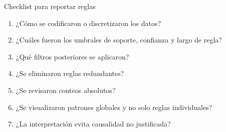 \documentclass[10pt,aspectratio=169]{beamer}
\begin{document}
%
%
%
%
%
%

\begin{frame}{Checklist para reportar reglas}
\begin{enumerate}
  \item ¿Cómo se codificaron o discretizaron los datos?
  \item ¿Cuáles fueron los umbrales de soporte, confianza y largo de regla?
  \item ¿Qué filtros posteriores se aplicaron?
  \item ¿Se eliminaron reglas redundantes?
  \item ¿Se revisaron conteos absolutos?
  \item ¿Se visualizaron patrones globales y no solo reglas individuales?
  \item ¿La interpretación evita causalidad no justificada?
\end{enumerate}
\end{frame}
\end{document}
